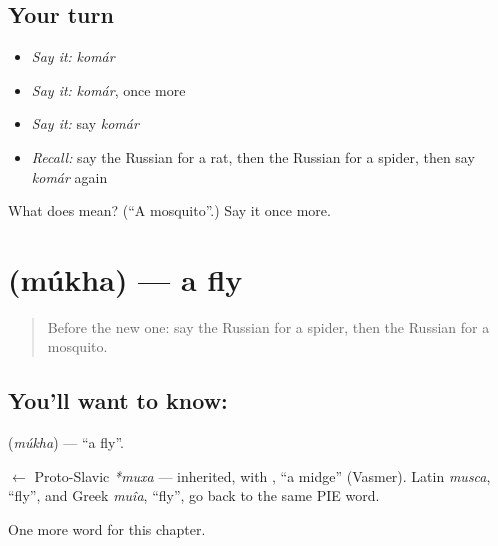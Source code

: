 \subsection*{Your turn}
\begin{itemize}
\raggedright
  \item \emph{Say it:} \emph{komár}
  \item \emph{Say it:} \emph{komár}, once more
  \item \emph{Say it:} say \emph{komár}
  \item \emph{Recall:} say the Russian for a rat, then the Russian for a spider, then say \emph{komár} again
\end{itemize}

\begin{tcolorbox}[breakable,colback=teal!4,colframe=teal!35!black,title={Before you move on}]
What does  mean? (\textquotedblleft{}A mosquito\textquotedblright{}.) Say it once more.
\end{tcolorbox}
\section[\texorpdfstring{\ru{муха} (múkha)}{муха (múkha)}]{ (múkha) — a fly}

\label{lesson:RU-C196-mukha}



\begin{quote}
Before the new one: say the Russian for a spider, then the Russian for a mosquito.
\end{quote}

\subsection*{You'll want to know: }
\textbf{} (\emph{múkha}) — \textquotedblleft{}a fly\textquotedblright{}.

\begin{cousinweb}
\textbf{} $\leftarrow$ Proto-Slavic \emph{*muxa} — inherited, with \emph{}, \textquotedblleft{}a midge\textquotedblright{} (Vasmer). Latin \emph{musca}, \textquotedblleft{}fly\textquotedblright{}, and Greek \emph{muîa}, \textquotedblleft{}fly\textquotedblright{}, go back to the same PIE word.
\end{cousinweb}

\begin{grammarlens}[title={What you've built}]
One more word for this chapter.
\end{grammarlens}

